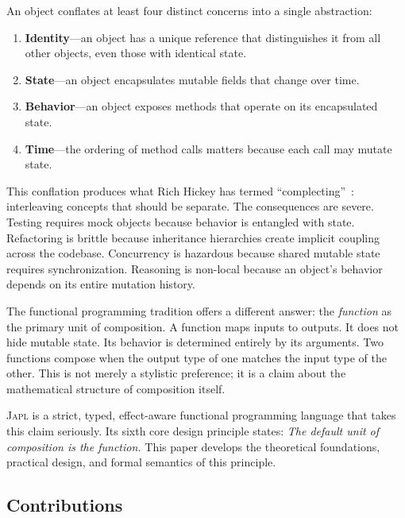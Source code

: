 \documentclass[11pt,a4paper]{article}
\newcommand{\japl}{\textsc{Japl}}
\begin{document}
An object conflates at least four distinct concerns into a single abstraction:
\begin{enumerate}[label=(\roman*)]
  \item \textbf{Identity}---an object has a unique reference that distinguishes it from all other objects, even those with identical state.
  \item \textbf{State}---an object encapsulates mutable fields that change over time.
  \item \textbf{Behavior}---an object exposes methods that operate on its encapsulated state.
  \item \textbf{Time}---the ordering of method calls matters because each call may mutate state.
\end{enumerate}

This conflation produces what Rich Hickey has termed ``complecting''~\citep{hickey2012simple}: interleaving concepts that should be separate. The consequences are severe. Testing requires mock objects because behavior is entangled with state. Refactoring is brittle because inheritance hierarchies create implicit coupling across the codebase. Concurrency is hazardous because shared mutable state requires synchronization. Reasoning is non-local because an object's behavior depends on its entire mutation history.

The functional programming tradition offers a different answer: the \emph{function} as the primary unit of composition. A function maps inputs to outputs. It does not hide mutable state. Its behavior is determined entirely by its arguments. Two functions compose when the output type of one matches the input type of the other. This is not merely a stylistic preference; it is a claim about the mathematical structure of composition itself.

\japl{} is a strict, typed, effect-aware functional programming language that takes this claim seriously. Its sixth core design principle states: \emph{The default unit of composition is the function.} This paper develops the theoretical foundations, practical design, and formal semantics of this principle.

\subsection{Contributions}
\end{document}

